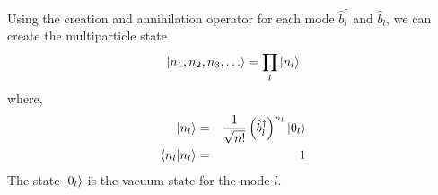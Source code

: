 \documentclass{article}
\begin{document}
Using the creation and annihilation operator for each mode $\hat{b}_l ^\dagger$ and $\hat{b}_l$, we can create the multiparticle state
\begin{equation*}
    \ket{ n_1, n_2, n_3, \dots } = \prod_l \ket{n_l} 
\end{equation*}
where, 
\begin{eqnarray*}
    \ket{n_l} &=& \frac{1}{\sqrt{n!}} \left( \hat{b} _l ^\dagger \right)^{n_l} \ket{0_l}  \\
    \braket{ n_l | n_l } &=& 1
\end{eqnarray*}
The state $\ket{0_l}$ is the vacuum state for the mode $l$. 
\end{document}
